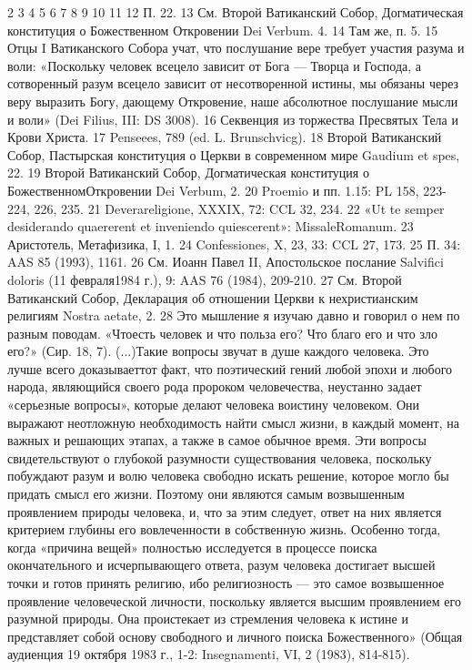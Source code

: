 \documentclass[a5paper,10pt]{article}
\begin{document}
2 
3 
4 
5 
6 
7 
8 
9 
10 
11 
12 П. 22.
13 См. Второй Ватиканский Собор, Догматическая конституция о Божественном Откровении Dei Verbum. 4.
14 Там же, п. 5.
15 Отцы I Ватиканского Собора учат, что послушание вере требует участия разума и воли: «Поскольку человек всецело зависит от Бога — Творца и Господа, а сотворенный разум всецело зависит от несотворенной истины, мы обязаны через веру выразить Богу, дающему Откровение, наше абсолютное послушание мысли и воли» (Dei Filius, III: DS 3008).
16 Секвенция из торжества Пресвятых Тела и Крови Христа.
17 Penseees, 789 (ed. L. Brunschvicg).
18 Второй Ватиканский Собор, Пастырская конституция о Церкви в современном мире Gaudium et spes, 22.
19 Второй Ватиканский Собор, Догматическая конституция о БожественномОткровении Dei Verbum, 2.
20 Proemio и пп. 1.15: PL 158, 223-224, 226, 235.
21 Deverareligione, XXXIX, 72: CCL 32, 234.
22 «Ut te semper desiderando quaererent et inveniendo quiescerent»: MissaleRomanum.
23 Аристотель, Метафизика, I, 1.
24 Confessiones, X, 23, 33: CCL 27, 173.
25 П. 34: AAS 85 (1993), 1161.
26 См. Иоанн Павел II, Апостольское послание Salvifici doloris (11 февраля1984 г.), 9: AAS 76 (1984), 209-210.
27 См. Второй Ватиканский Собор, Декларация об отношении Церкви к нехристианским религиям Nostra aetate, 2.
28 Это мышление я изучаю давно и говорил о нем по разным поводам. «Чтоесть человек и что польза его? Что благо его и что зло его?» (Сир. 18, 7). (...)Такие вопросы звучат в душе каждого человека. Это лучше всего доказываеттот факт, что поэтический гений любой эпохи и любого народа, являющийся своего рода пророком человечества, неустанно задает «серьезные вопросы», которые делают человека воистину человеком. Они выражают неотложную необходимость найти смысл жизни, в каждый момент, на важных и решающих этапах, а также в самое обычное время. Эти вопросы свидетельствуют о глубокой разумности существования человека, поскольку побуждают разум и волю человека свободно искать решение, которое могло
бы придать смысл его жизни. Поэтому они являются самым возвышенным проявлением природы человека, и, что за этим следует, ответ на них является критерием глубины его вовлеченности в собственную жизнь. Особенно тогда, когда «причина вещей» полностью исследуется в процессе поиска окончательного и исчерпывающего ответа, разум человека достигает высшей точки и готов принять религию, ибо религиозность — это самое возвышенное проявление человеческой личности, поскольку является высшим проявлением его разумной природы. Она проистекает из стремления человека к истине и представляет собой основу свободного и личного поиска Божественного» (Общая аудиенция 19 октября 1983 г., 1-2: Insegnamenti, VI, 2 (1983), 814-815).
\end{document}
